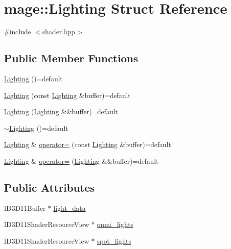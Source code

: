 \hypertarget{structmage_1_1_lighting}{}\section{mage\+:\+:Lighting Struct Reference}
\label{structmage_1_1_lighting}


{\ttfamily \#include $<$shader.\+hpp$>$}

\subsection*{Public Member Functions}
\begin{DoxyCompactItemize}
\item 
\hyperlink{structmage_1_1_lighting_a7017afad521df6eacf2c45ae0f5adfd5}{Lighting} ()=default
\item 
\hyperlink{structmage_1_1_lighting_ae92175ad94cc88badf2dc4fd93cb2e2f}{Lighting} (const \hyperlink{structmage_1_1_lighting}{Lighting} \&buffer)=default
\item 
\hyperlink{structmage_1_1_lighting_a03ce177d02db1f7ee2b779aa4cb321c1}{Lighting} (\hyperlink{structmage_1_1_lighting}{Lighting} \&\&buffer)=default
\item 
\hyperlink{structmage_1_1_lighting_a2b357cb6853d05bae8be16fc6d63a6c3}{$\sim$\+Lighting} ()=default
\item 
\hyperlink{structmage_1_1_lighting}{Lighting} \& \hyperlink{structmage_1_1_lighting_af3407499990673e6a6880cbcc5f5b054}{operator=} (const \hyperlink{structmage_1_1_lighting}{Lighting} \&buffer)=default
\item 
\hyperlink{structmage_1_1_lighting}{Lighting} \& \hyperlink{structmage_1_1_lighting_adf7079d86353561a08e1729932d5e9e2}{operator=} (\hyperlink{structmage_1_1_lighting}{Lighting} \&\&buffer)=default
\end{DoxyCompactItemize}
\subsection*{Public Attributes}
\begin{DoxyCompactItemize}
\item 
I\+D3\+D11\+Buffer $\ast$ \hyperlink{structmage_1_1_lighting_aa8c55bf975d3d77e8d598591a9268766}{light\+\_\+data}
\item 
I\+D3\+D11\+Shader\+Resource\+View $\ast$ \hyperlink{structmage_1_1_lighting_add6b516f28826b888466df39f7db5e35}{omni\+\_\+lights}
\item 
I\+D3\+D11\+Shader\+Resource\+View $\ast$ \hyperlink{structmage_1_1_lighting_a6d9e373787f009cabac09319074aaf2e}{spot\+\_\+lights}
\end{DoxyCompactItemize}


